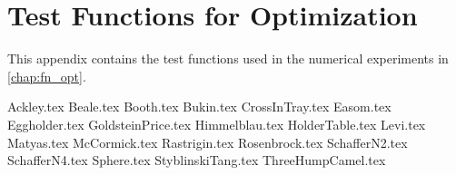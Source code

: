 \chapter{Test Functions for Optimization}
\label{app:test_functions}
  This appendix contains the test functions used in the numerical experiments in 
  \vref{chap:fn_opt}.

  {Ackley.tex}
  {Beale.tex}
  {Booth.tex}
  {Bukin.tex}
  {CrossInTray.tex}
  {Easom.tex}
  {Eggholder.tex}
  {GoldsteinPrice.tex}
  {Himmelblau.tex}
  {HolderTable.tex}
  {Levi.tex}
  {Matyas.tex}
  {McCormick.tex}
  {Rastrigin.tex}
  {Rosenbrock.tex}
  {SchafferN2.tex}
  {SchafferN4.tex}
  {Sphere.tex}
  {StyblinskiTang.tex}
  {ThreeHumpCamel.tex}